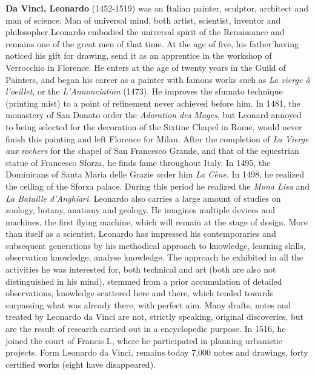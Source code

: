 \textbf{Da Vinci, Leonardo }(1452-1519) was an Italian painter, sculptor, architect and man of science. Man of universal mind, both artist, scientist, inventor and philosopher Leonardo embodied the universal spirit of the Renaissance and remains one of the great men of that time. At the age of five, his father having noticed his gift for drawing, send it as an apprentice in the workshop of Verrocchio in Florence. He enters at the age of twenty years in the Guild of Painters, and began his career as a painter with famous works such as \textit{La vierge à l'oeillet}, or the \textit{L'Annonciation} (1473). He improves the sfumato technique (printing mist) to a point of refinement never achieved before him. In 1481, the monastery of San Donato order the \textit{Adoration des Mages}, but Leonard annoyed to being selected for the decoration of the Sixtine Chapel in Rome, would never finish this painting and left Florence for Milan. After the completion of \textit{La Vierge aux rochers} for the chapel of San Francesco Grande, and that of the equestrian statue of Francesco Sforza, he finds fame throughout Italy. In 1495, the Dominicans of Santa Maria delle Grazie order him \textit{La Cène}. In 1498, he realized the ceiling of the Sforza palace. During this period he realized the \textit{Mona Lisa} and \textit{La Bataille d'Anghiari}. Leonardo also carries a large amount of studies on zoology, botany, anatomy and geology. He imagines multiple devices and machines, the first flying machine, which will remain at the stage of design. More than itself as a scientist, Leonardo has impressed his contemporaries and subsequent generations by his methodical approach to knowledge, learning skills, observation knowledge, analyse knowledge. The approach he exhibited in all the activities he was interested for, both technical and art (both are also not distinguished in his mind), stemmed from a prior accumulation of detailed observations, knowledge scattered here and there, which tended towards surpassing what was already there, with perfect aim. Many drafts, notes and treated by Leonardo da Vinci are not, strictly speaking, original discoveries, but are the result of research carried out in a encyclopedic purpose. In 1516, he joined the court of Francis I., where he participated in planning urbanistic projects. Form Leonardo da Vinci, remains today 7,000 notes and drawings, forty certified works (eight have disappeared).

